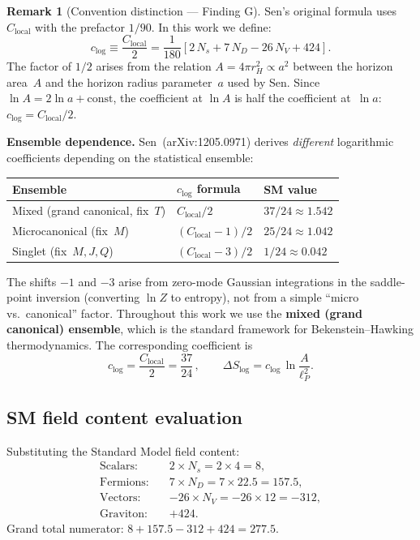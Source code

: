 \documentclass[11pt,a4paper]{article}
\newcommand{\lP}{\ell_P}
\theoremstyle{plain}
\theoremstyle{definition}
\newtheorem{remark}[theorem]{Remark}
\begin{document}
\begin{remark}[Convention distinction --- Finding G]\label{rem:convention}
Sen's original formula uses $C_{\mathrm{local}}$ with the prefactor $1/90$.
In this work we define:
\begin{equation}\label{eq:clog-def}
  c_{\log} \equiv \frac{C_{\mathrm{local}}}{2}
  = \frac{1}{180}\left[
    2\,N_s + 7\,N_D - 26\,N_V + 424
  \right].
\end{equation}
The factor of $1/2$ arises from the relation $A = 4\pi r_H^2 \propto a^2$
between the horizon area~$A$ and the horizon radius parameter~$a$ used by
Sen.  Since $\ln A = 2\ln a + \text{const}$, the coefficient at
$\ln A$ is half the coefficient at~$\ln a$: $c_{\log} = C_{\mathrm{local}}/2$.

\textbf{Ensemble dependence.}  Sen~(arXiv:1205.0971) derives \emph{different}
logarithmic coefficients depending on the statistical ensemble:
\begin{center}
\begin{tabular}{lll}
\toprule
Ensemble & $c_{\log}$ formula & SM value \\
\midrule
Mixed (grand canonical, fix~$T$) & $C_{\mathrm{local}}/2$ & $37/24 \approx 1.542$ \\
Microcanonical (fix~$M$) & $(C_{\mathrm{local}}-1)/2$ & $25/24 \approx 1.042$ \\
Singlet (fix~$M,J,Q$) & $(C_{\mathrm{local}}-3)/2$ & $1/24 \approx 0.042$ \\
\bottomrule
\end{tabular}
\end{center}
The shifts $-1$ and $-3$ arise from zero-mode Gaussian integrations in the
saddle-point inversion (converting $\ln Z$ to entropy), not from a simple
``micro vs.\ canonical'' factor.
Throughout this work we use the \textbf{mixed (grand canonical) ensemble},
which is the standard framework for Bekenstein--Hawking thermodynamics.
The corresponding coefficient is
\begin{equation}
  c_{\log} = \frac{C_{\mathrm{local}}}{2} = \frac{37}{24}\,,
  \qquad
  \Delta S_{\log} = c_{\log}\,\ln\frac{A}{\lP^2}.
\end{equation}
\end{remark}

\subsection{SM field content evaluation}

Substituting the Standard Model field content:
\begin{align}
  \text{Scalars:}\quad & 2 \times N_s = 2 \times 4 = 8, \\
  \text{Fermions:}\quad & 7 \times N_D = 7 \times 22.5 = 157.5, \\
  \text{Vectors:}\quad & -26 \times N_V = -26 \times 12 = -312, \\
  \text{Graviton:}\quad & +424.
\end{align}
Grand total numerator: $8 + 157.5 - 312 + 424 = 277.5$.
\end{document}
